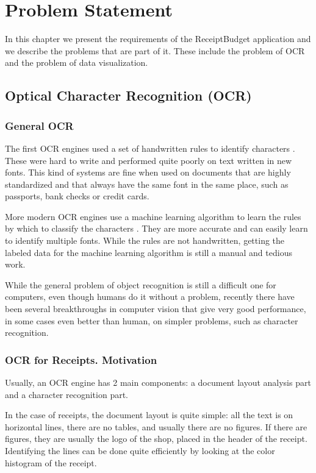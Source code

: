 \chapter{Problem Statement}
\label{chap:statement}

In this chapter we present the requirements of the ReceiptBudget application and we describe the problems that are part of it. These include the problem of OCR and the problem of data visualization.

\section{Optical Character Recognition (OCR)}
\subsection{General OCR}

The first OCR engines used a set of handwritten rules to identify characters  \cite{shepard1971reading}. These were hard to write and performed quite poorly on text written in new fonts. This kind of systems are fine when used on documents that are highly standardized and that always have the same font in the same place, such as passports, bank checks or credit cards. 

More modern OCR engines use a machine learning algorithm to learn the rules by which to classify the characters \cite{smith2007overview}. They are more accurate and can easily learn to identify multiple fonts. While the rules are not handwritten, getting the labeled data for the machine learning algorithm is still a manual and tedious work. 

While the general problem of object recognition is still a difficult one for computers, even though humans do it without a problem, recently there have been several breakthroughs in computer vision that give very good performance, in some cases even better than human, on simpler problems, such as character recognition. 

\subsection{OCR for Receipts. Motivation}
Usually, an OCR engine has 2 main components: a document layout analysis part and a character recognition part. 

In the case of receipts, the document layout is quite simple: all the text is on horizontal lines, there are no tables, and usually there are no figures. If there are figures, they are usually the logo of the shop, placed in the header of the receipt. Identifying the lines can be done quite efficiently by looking at the color histogram of the receipt. 

